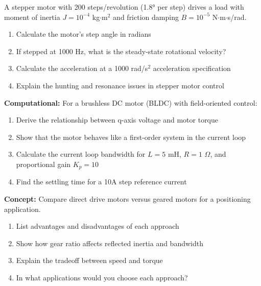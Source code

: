 \begin{exercise}
A stepper motor with 200 steps/revolution (1.8° per step) drives a load with moment of inertia $J = 10^{-4}$ kg$\cdot$m$^2$ and friction damping $B = 10^{-5}$ N$\cdot$m$\cdot$s/rad.

\begin{enumerate}[label=(\alph*)]
    \item Calculate the motor's step angle in radians
    \item If stepped at 1000 Hz, what is the steady-state rotational velocity?
    \item Calculate the acceleration at a 1000 rad/s$^2$ acceleration specification
    \item Explain the hunting and resonance issues in stepper motor control
\end{enumerate}
\end{exercise}

\begin{exercise}
\textbf{Computational:} For a brushless DC motor (BLDC) with field-oriented control:

\begin{enumerate}[label=(\alph*)]
    \item Derive the relationship between q-axis voltage and motor torque
    \item Show that the motor behaves like a first-order system in the current loop
    \item Calculate the current loop bandwidth for $L = 5$ mH, $R = 1$ $\Omega$, and proportional gain $K_p = 10$
    \item Find the settling time for a 10A step reference current
\end{enumerate}
\end{exercise}

\begin{exercise}
\textbf{Concept:} Compare direct drive motors versus geared motors for a positioning application.

\begin{enumerate}[label=(\alph*)]
    \item List advantages and disadvantages of each approach
    \item Show how gear ratio affects reflected inertia and bandwidth
    \item Explain the tradeoff between speed and torque
    \item In what applications would you choose each approach?
\end{enumerate}
\end{exercise}
